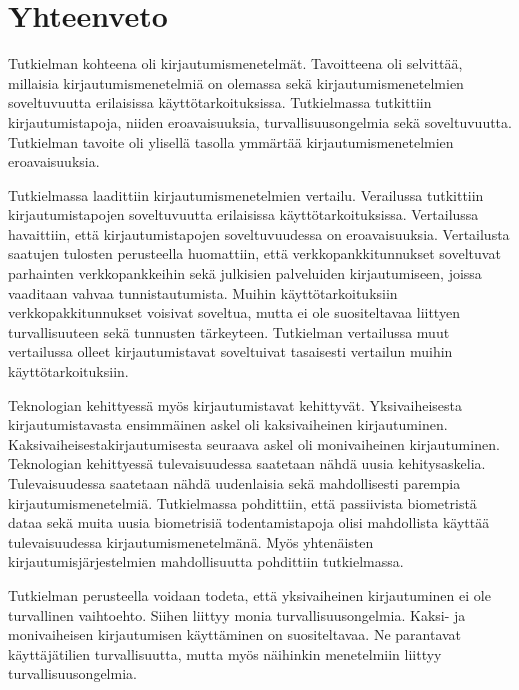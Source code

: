 \chapter{Yhteenveto\label{yhteenveto}}

Tutkielman kohteena oli kirjautumismenetelmät. Tavoitteena oli selvittää, millaisia kirjautumismenetelmiä on olemassa sekä kirjautumismenetelmien soveltuvuutta erilaisissa käyttötarkoituksissa. Tutkielmassa tutkittiin kirjautumistapoja, niiden eroavaisuuksia, turvallisuusongelmia sekä soveltuvuutta. Tutkielman tavoite oli ylisellä tasolla ymmärtää kirjautumismenetelmien eroavaisuuksia.

Tutkielmassa laadittiin kirjautumismenetelmien vertailu. Verailussa tutkittiin kirjautumistapojen soveltuvuutta erilaisissa käyttötarkoituksissa. Vertailussa havaittiin, että kirjautumistapojen soveltuvuudessa on eroavaisuuksia. Vertailusta saatujen tulosten perusteella huomattiin, että verkkopankkitunnukset soveltuvat parhainten verkkopankkeihin sekä julkisien palveluiden kirjautumiseen, joissa vaaditaan vahvaa tunnistautumista. Muihin käyttötarkoituksiin verkkopakkitunnukset voisivat soveltua, mutta ei ole suositeltavaa liittyen turvallisuuteen sekä tunnusten tärkeyteen. Tutkielman vertailussa muut vertailussa olleet kirjautumistavat soveltuivat tasaisesti vertailun muihin käyttötarkoituksiin.

Teknologian kehittyessä myös kirjautumistavat kehittyvät. Yksivaiheisesta kirjautumistavasta ensimmäinen askel oli kaksivaiheinen kirjautuminen. Kaksivaiheisestakirjautumisesta seuraava askel oli monivaiheinen kirjautuminen. Teknologian kehittyessä tulevaisuudessa saatetaan nähdä uusia kehitysaskelia. Tulevaisuudessa saatetaan nähdä uudenlaisia sekä mahdollisesti parempia kirjautumismenetelmiä. Tutkielmassa pohdittiin, että passiivista biometristä dataa sekä muita uusia biometrisiä todentamistapoja olisi mahdollista käyttää tulevaisuudessa kirjautumismenetelmänä. Myös yhtenäisten kirjautumisjärjestelmien mahdollisuutta pohdittiin tutkielmassa.

Tutkielman perusteella voidaan todeta, että yksivaiheinen kirjautuminen ei ole turvallinen vaihtoehto. Siihen liittyy monia turvallisuusongelmia. Kaksi- ja monivaiheisen kirjautumisen käyttäminen on suositeltavaa. Ne parantavat käyttäjätilien turvallisuutta, mutta myös näihinkin menetelmiin liittyy turvallisuusongelmia. 
